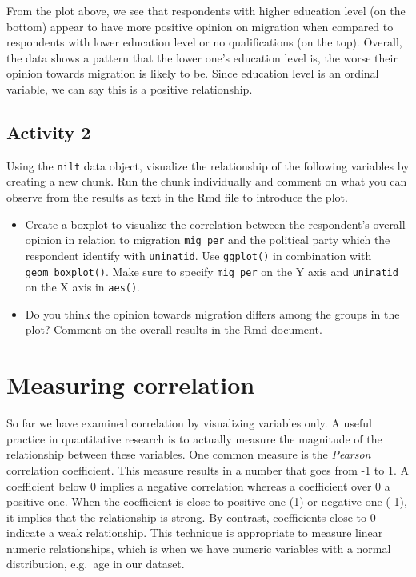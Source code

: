 \documentclass[
]{book}
\providecommand{\tightlist}{%
  \setlength{\itemsep}{0pt}\setlength{\parskip}{0pt}}
\begin{document}
From the plot above, we see that respondents with higher education level (on the bottom) appear to have more positive opinion on migration when compared to respondents with lower education level or no qualifications (on the top). Overall, the data shows a pattern that the lower one's education level is, the worse their opinion towards migration is likely to be. Since education level is an ordinal variable, we can say this is a positive relationship.

\hypertarget{activity-2-2}{%
\subsection{Activity 2}\label{activity-2-2}}

Using the \texttt{nilt} data object, visualize the relationship of the following variables by creating a new chunk. Run the chunk individually and comment on what you can observe from the results as text in the Rmd file to introduce the plot.

\begin{itemize}
\tightlist
\item
  Create a boxplot to visualize the correlation between the respondent's overall opinion in relation to migration \texttt{mig\_per} and the political party which the respondent identify with \texttt{uninatid}. Use \texttt{ggplot()} in combination with \texttt{geom\_boxplot()}. Make sure to specify \texttt{mig\_per} on the Y axis and \texttt{uninatid} on the X axis in \texttt{aes()}.
\item
  Do you think the opinion towards migration differs among the groups in the plot? Comment on the overall results in the Rmd document.
\end{itemize}

\hypertarget{measuring-correlation}{%
\section{Measuring correlation}\label{measuring-correlation}}

So far we have examined correlation by visualizing variables only. A useful practice in quantitative research is to actually measure the magnitude of the relationship between these variables. One common measure is the \emph{Pearson} correlation coefficient. This measure results in a number that goes from -1 to 1. A coefficient below 0 implies a negative correlation whereas a coefficient over 0 a positive one. When the coefficient is close to positive one (1) or negative one (-1), it implies that the relationship is strong. By contrast, coefficients close to 0 indicate a weak relationship. This technique is appropriate to measure linear numeric relationships, which is when we have numeric variables with a normal distribution, e.g.~age in our dataset.
\end{document}
